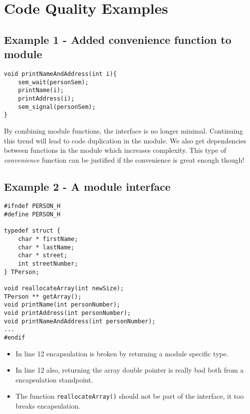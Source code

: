 \appendix
\section{Code Quality Examples}
\subsection{Example 1 - Added convenience function to module}

\begin{verbatim}
void printNameAndAddress(int i){
    sem_wait(personSem);
    printName(i);
    printAddress(i);
    sem_signal(personSem);
}
\end{verbatim}
By combining module functions, the interface is no longer minimal. Continuing this trend will lead to code duplication in the module. We also get dependencies between functions in the module which increases complexity. This type of \textit{convenience} function can be justified if the convenience is great enough though!

\subsection{Example 2 - A module interface}
\begin{verbatim}
#ifndef PERSON_H
#define PERSON_H

typedef struct {
	char * firstName;
	char * lastName;
	char * street;
	int streetNumber;
} TPerson;

void reallocateArray(int newSize);
TPerson ** getArray();
void printName(int personNumber);
void printAddress(int personNumber);
void printNameAndAddress(int personNumber);
...
#endif
\end{verbatim}
\begin{itemize}
\item In line 12 encapsulation is broken by returning a module specific type.
\item In line 12 also, returning the array double pointer is really bad both from a encapsulation standpoint.
\item The function \texttt{reallocateArray()} should not be part of the interface, it too breaks encapsulation.
\end{itemize}

